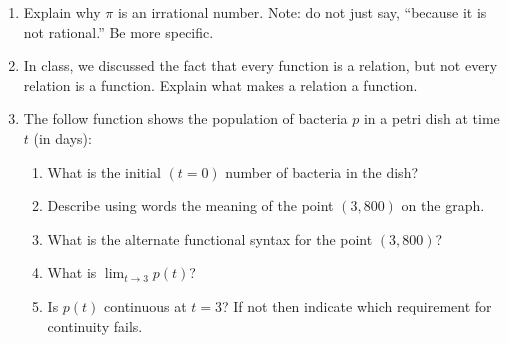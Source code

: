 \documentclass[letterpaper,12pt,fleqn]{article}
\begin{document}
\begin{enumerate}[left=0pt,itemsep=0.5in]

\item Explain why \(\pi\) is an irrational number.  Note: do not just say, ``because it is not rational.''
  Be more specific.

\item In class, we discussed the fact that every function is a relation, but not every relation is a function.
  Explain what makes a relation a function.

\item The follow function shows the population of bacteria \(p\) in a petri dish at time \(t\) (in days):

  \bigskip

  \begin{center}
  \end{center}

  \bigskip

  \begin{enumerate}
  \item What is the initial \((t=0)\) number of bacteria in the dish?
  \item Describe using words the meaning of the point \((3,800)\) on the graph.
  \item What is the alternate functional syntax for the point \((3,800)\)?
  \item What is \(\displaystyle\lim_{t\to3}p(t)\)?
  \item Is \(p(t)\) continuous at \(t=3\)?  If not then indicate which requirement for continuity fails.
  \end{enumerate}


\end{enumerate}
\end{document}

